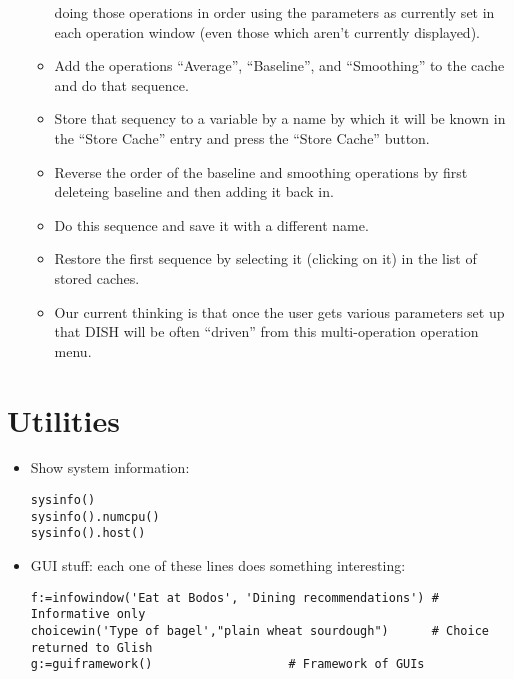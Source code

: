 \begin{itemize}
\begin{itemize}
doing those operations in order using the parameters as currently set
in each operation window (even those which aren't currently displayed).
\item Add the operations ``Average'', ``Baseline'', and ``Smoothing'' to
the cache and do that sequence.
\item Store that sequency to a variable by a name by which it will be known 
in the ``Store Cache'' entry and press the ``Store Cache'' button.
\item Reverse the order of the baseline and smoothing operations by
first deleteing baseline and then adding it back in.
\item Do this sequence and save it with a different name.
\item Restore the first sequence by selecting it (clicking on it) in the
list of stored caches.
\item Our current thinking is that once the user gets various parameters
set up that DISH will be often ``driven'' from this multi-operation
operation menu.
\end{itemize}
\end{itemize}

\section{Utilities}

\begin{itemize}
\item Show system information:
\begin{verbatim}
sysinfo()
sysinfo().numcpu()
sysinfo().host()
\end{verbatim}
\item GUI stuff: each one of these lines does something interesting:
\begin{verbatim}
f:=infowindow('Eat at Bodos', 'Dining recommendations') # Informative only
choicewin('Type of bagel',"plain wheat sourdough")      # Choice returned to Glish
g:=guiframework()					# Framework of GUIs
\end{verbatim}
\end{itemize}

